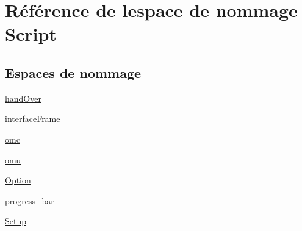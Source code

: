 \hypertarget{namespaceScript}{}\section{Référence de l\textquotesingle{}espace de nommage Script}
\label{namespaceScript}
\subsection*{Espaces de nommage}
\begin{DoxyCompactItemize}
\item 
 \hyperlink{namespaceScript_1_1handOver}{hand\+Over}
\item 
 \hyperlink{namespaceScript_1_1interfaceFrame}{interface\+Frame}
\item 
 \hyperlink{namespaceScript_1_1omc}{omc}
\item 
 \hyperlink{namespaceScript_1_1omu}{omu}
\item 
 \hyperlink{namespaceScript_1_1Option}{Option}
\item 
 \hyperlink{namespaceScript_1_1progress__bar}{progress\+\_\+bar}
\item 
 \hyperlink{namespaceScript_1_1Setup}{Setup}
\end{DoxyCompactItemize}
